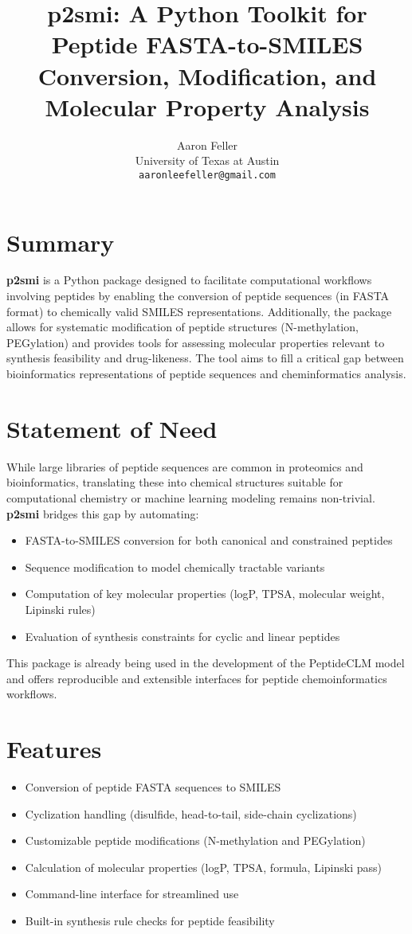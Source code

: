 \documentclass[10pt]{article}
\title{p2smi: A Python Toolkit for Peptide FASTA-to-SMILES Conversion, Modification, and Molecular Property Analysis}
\author{
Aaron Feller \\
University of Texas at Austin \\
\texttt{aaronleefeller@gmail.com}
}
\date{}
\begin{document}
\maketitle

\section*{Summary}

\textbf{p2smi} is a Python package designed to facilitate computational workflows involving peptides by enabling the conversion of peptide sequences (in FASTA format) to chemically valid SMILES representations. Additionally, the package allows for systematic modification of peptide structures (N-methylation, PEGylation) and provides tools for assessing molecular properties relevant to synthesis feasibility and drug-likeness. The tool aims to fill a critical gap between bioinformatics representations of peptide sequences and cheminformatics analysis.

\section*{Statement of Need}

While large libraries of peptide sequences are common in proteomics and bioinformatics, translating these into chemical structures suitable for computational chemistry or machine learning modeling remains non-trivial. \textbf{p2smi} bridges this gap by automating:  
\begin{itemize}
    \item FASTA-to-SMILES conversion for both canonical and constrained peptides
    \item Sequence modification to model chemically tractable variants
    \item Computation of key molecular properties (logP, TPSA, molecular weight, Lipinski rules)
    \item Evaluation of synthesis constraints for cyclic and linear peptides
\end{itemize}
This package is already being used in the development of the PeptideCLM model and offers reproducible and extensible interfaces for peptide chemoinformatics workflows.

\section*{Features}
\begin{itemize}
    \item Conversion of peptide FASTA sequences to SMILES
    \item Cyclization handling (disulfide, head-to-tail, side-chain cyclizations)
    \item Customizable peptide modifications (N-methylation and PEGylation)
    \item Calculation of molecular properties (logP, TPSA, formula, Lipinski pass)
    \item Command-line interface for streamlined use
    \item Built-in synthesis rule checks for peptide feasibility
\end{itemize}
\end{document}
